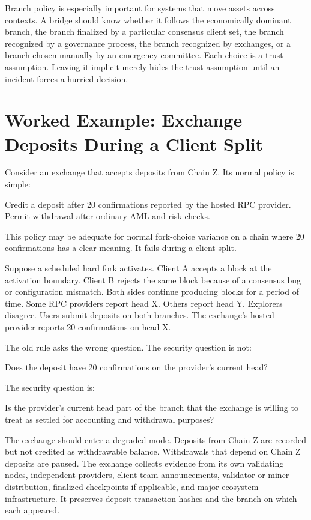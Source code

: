 Branch policy is especially important for systems that move assets across contexts. A bridge should know whether it follows the economically dominant branch, the branch finalized by a particular consensus client set, the branch recognized by a governance process, the branch recognized by exchanges, or a branch chosen manually by an emergency committee. Each choice is a trust assumption. Leaving it implicit merely hides the trust assumption until an incident forces a hurried decision.

\section{Worked Example: Exchange Deposits During a Client Split}

Consider an exchange that accepts deposits from Chain Z. Its normal policy is simple:

\begin{codeblock}
Credit a deposit after 20 confirmations reported by the hosted RPC provider.
Permit withdrawal after ordinary AML and risk checks.
\end{codeblock}

This policy may be adequate for normal fork-choice variance on a chain where 20 confirmations has a clear meaning. It fails during a client split.

Suppose a scheduled hard fork activates. Client A accepts a block at the activation boundary. Client B rejects the same block because of a consensus bug or configuration mismatch. Both sides continue producing blocks for a period of time. Some RPC providers report head X. Others report head Y. Explorers disagree. Users submit deposits on both branches. The exchange's hosted provider reports 20 confirmations on head X.

The old rule asks the wrong question. The security question is not:

\begin{codeblock}
Does the deposit have 20 confirmations on the provider's current head?
\end{codeblock}

The security question is:

\begin{codeblock}
Is the provider's current head part of the branch that the exchange is willing
to treat as settled for accounting and withdrawal purposes?
\end{codeblock}

The exchange should enter a degraded mode. Deposits from Chain Z are recorded but not credited as withdrawable balance. Withdrawals that depend on Chain Z deposits are paused. The exchange collects evidence from its own validating nodes, independent providers, client-team announcements, validator or miner distribution, finalized checkpoints if applicable, and major ecosystem infrastructure. It preserves deposit transaction hashes and the branch on which each appeared.

